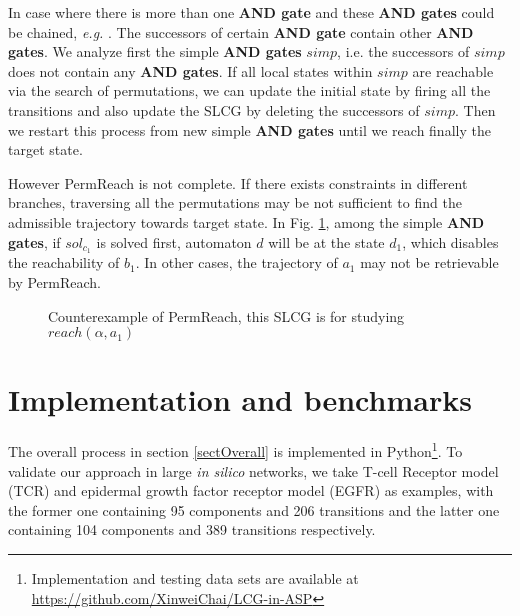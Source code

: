 \documentclass[runningheads]{llncs}
\begin{document}
In case where there is more than one \textbf{AND gate} and these \textbf{AND gates} could be chained, \textit{e.g.} \cite{samaga2009logic}.
The successors of certain \textbf{AND gate} contain other \textbf{AND gates}.
We analyze first the simple \textbf{AND gates} $simp$, i.e. the successors of $simp$ does not contain any \textbf{AND gates}.
If all local states within $simp$ are reachable via the search of permutations, we can update the initial state by firing all the transitions and also update the SLCG by deleting the successors of $simp$. 
Then we restart this process from new simple \textbf{AND gates} until we reach finally the target state.

However PermReach is not complete. 
If there exists constraints in different branches, traversing all the permutations may be not sufficient to find the admissible trajectory towards target state.
In Fig. \ref{FigConflictInForks}, among the simple \textbf{AND gates}, if $sol_{c_1}$ is solved first, automaton $d$ will be at the state $d_1$, which disables the reachability of $b_1$.
In other cases, the trajectory of $a_1$ may not be retrievable by PermReach.
\begin{figure}[ht]
\centering

\caption{Counterexample of PermReach, this SLCG is for studying $reach(\alpha,a_1)$}\label{FigConflictInForks}
\end{figure}


\section{Implementation and benchmarks}\label{sect:5}
The overall process in section \ref{sectOverall} is implemented in Python\footnote{Implementation and testing data sets are available at \url{https://github.com/XinweiChai/LCG-in-ASP}}. 
To validate our approach in large \textit{in silico} networks, we take T-cell Receptor model (TCR) \cite{saez2007logical} and epidermal growth factor receptor model (EGFR) \cite{samaga2009logic} as examples, with the former one containing 95 components and 206 transitions and the latter one containing 104 components and 389 transitions respectively. 
\end{document}
